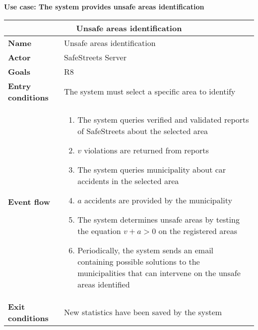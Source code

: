 \begin{description}
    \item \textbf{Use case: The system provides unsafe areas identification}
    \begin{center}
        \begin{tabular}{|p{3cm}|p{7cm}|}
            \multicolumn{2}{c}{\textbf{Unsafe areas identification}} \\
            \hline
            \textbf{Name} & Unsafe areas identification \\
            \hline
            \textbf{Actor} & SafeStreets Server \\
            \hline
            \textbf{Goals} & R8 \\
            \hline
            \textbf{Entry conditions} &  The system must select a specific area to identify\\
            \hline
            \textbf{Event flow} &
            \begin{enumerate}
                \item The system queries verified and validated reports of SafeStreets about the selected area
                \item $v$ violations are returned from reports
                \item The system queries municipality about car accidents in the selected area
                \item $a$ accidents are provided by the municipality
                \item The system determines unsafe areas by testing the equation $v + a > 0$ on the registered areas
                \item Periodically, the system sends an email containing possible solutions to the municipalities that can intervene on the unsafe areas identified
            \end{enumerate} \\
            \hline
            \textbf{Exit conditions} & New statistics have been saved by the system \\
            \hline
        \end{tabular}
    \end{center}
\end{description}

